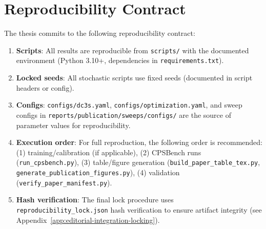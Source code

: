 \section{Reproducibility Contract}
\label{sec:reproducibility}

The thesis commits to the following reproducibility contract:

\begin{enumerate}
\item \textbf{Scripts}: All results are reproducible from \texttt{scripts/} with the documented environment (Python 3.10+, dependencies in \texttt{requirements.txt}).
\item \textbf{Locked seeds}: All stochastic scripts use fixed seeds (documented in script headers or config).

\item \textbf{Configs}: \texttt{configs/dc3s.yaml}, \texttt{configs/optimization.yaml}, and sweep configs in \texttt{reports/publication/sweeps/configs/} are the source of parameter values for reproducibility.

\item \textbf{Execution order}: For full reproduction, the following order is recommended: (1) training/calibration (if applicable), (2) CPSBench runs (\texttt{run\_cpsbench.py}), (3) table/figure generation (\texttt{build\_paper\_table\_tex.py}, \texttt{generate\_publication\_figures.py}), (4) validation (\texttt{verify\_paper\_manifest.py}).

\item \textbf{Hash verification}: The final lock procedure uses \texttt{reproducibility\_lock.json} hash verification to ensure artifact integrity (see Appendix~\ref{app:editorial-integration-locking}).
\end{enumerate}
